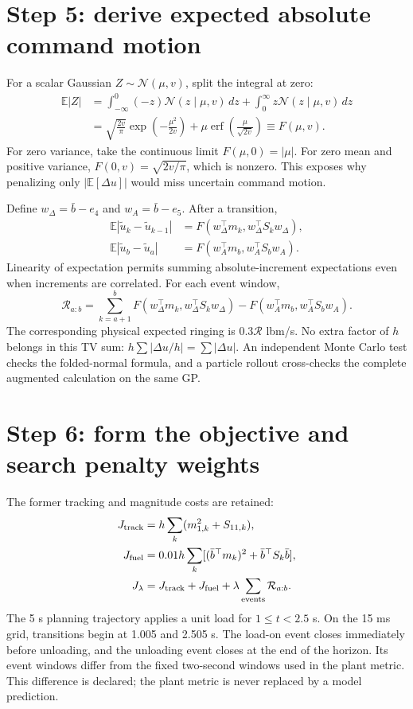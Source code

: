 \documentclass[11pt,a4paper]{article}
\newcommand{\E}{\mathbb E}\newcommand{\Cov}{\operatorname{Cov}}\newcommand{\Var}{\operatorname{Var}}
\begin{document}
\section{Step 5: derive expected absolute command motion}
For a scalar Gaussian $Z\sim\mathcal N(\mu,v)$, split the integral at zero:
\begin{align}
\E|Z|&=\int_{-\infty}^0(-z)\mathcal N(z\mid\mu,v)\,dz+
\int_0^\infty z\mathcal N(z\mid\mu,v)\,dz\\
&=\sqrt{\frac{2v}{\pi}}\exp\left(-\frac{\mu^2}{2v}\right)+
\mu\operatorname{erf}\left(\frac{\mu}{\sqrt{2v}}\right)
\equiv F(\mu,v).
\end{align}
For zero variance, take the continuous limit $F(\mu,0)=|\mu|$. For zero mean and positive variance, $F(0,v)=\sqrt{2v/\pi}$, which is nonzero. This exposes why penalizing only $|\E[\Delta u]|$ would miss uncertain command motion.

Define $w_\Delta=\bar b-e_4$ and $w_A=\bar b-e_5$. After a transition,
\begin{align}
\E|\tilde u_k-\tilde u_{k-1}|&=F(w_\Delta^\top m_k,w_\Delta^\top S_kw_\Delta),\\
\E|\tilde u_b-\tilde u_a|&=F(w_A^\top m_b,w_A^\top S_bw_A).
\end{align}
Linearity of expectation permits summing absolute-increment expectations even when increments are correlated. For each event window,
\begin{equation}
\mathcal R_{a:b}=\sum_{k=a+1}^{b}F(w_\Delta^\top m_k,w_\Delta^\top S_kw_\Delta)
-F(w_A^\top m_b,w_A^\top S_bw_A).
\end{equation}
The corresponding physical expected ringing is $0.3\mathcal R$ lbm/s. No extra factor of $h$ belongs in this TV sum: $h\sum |\Delta u/h|=\sum|\Delta u|$. An independent Monte Carlo test checks the folded-normal formula, and a particle rollout cross-checks the complete augmented calculation on the same GP.

\section{Step 6: form the objective and search penalty weights}
The former tracking and magnitude costs are retained:
\begin{align}
J_{\rm track}&=h\sum_k(m_{1,k}^2+S_{11,k}),\\
J_{\rm fuel}&=0.01h\sum_k[(\bar b^\top m_k)^2+\bar b^\top S_k\bar b],\\
J_\lambda&=J_{\rm track}+J_{\rm fuel}+\lambda\sum_{\rm events}\mathcal R_{a:b}.
\end{align}
The 5 s planning trajectory applies a unit load for $1\le t<2.5$ s. On the 15 ms grid, transitions begin at 1.005 and 2.505 s. The load-on event closes immediately before unloading, and the unloading event closes at the end of the horizon. Its event windows differ from the fixed two-second windows used in the plant metric. This difference is declared; the plant metric is never replaced by a model prediction.
\end{document}
